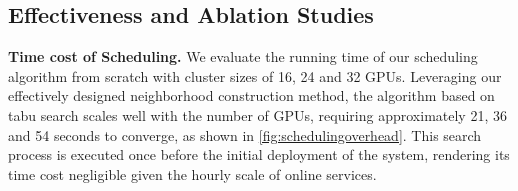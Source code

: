 \subsection{Effectiveness and Ablation Studies}
\label{sec:effectiveness_and_ablation}
\noindent \textbf{Time cost of Scheduling.}
We evaluate the running time of our scheduling algorithm from scratch with cluster sizes of 16, 24 and 32 GPUs.
Leveraging our effectively designed neighborhood construction method, the algorithm based on tabu search scales well with the number of GPUs, requiring approximately 21, 36 and 54 seconds to converge, as shown in \autoref{fig:schedulingoverhead}. This search process is executed once before the initial deployment of the system, rendering its time cost negligible given the hourly scale of online services. 






